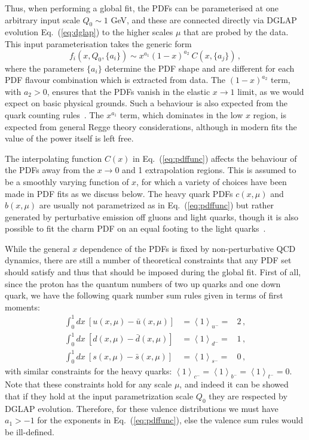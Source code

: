 Thus, when performing a global fit, the PDFs can be parameterised at one arbitrary input scale $Q_0\sim 1$ GeV, and these are connected directly via
DGLAP evolution
Eq.~(\ref{eq:dglap}) to the higher scales $\mu$ that are probed by the data.
This input parameterisation takes the generic form
\begin{equation}
\label{eq:pdffunc}
f_{i}(x,Q_0,\{a_i\})\sim x^{a_1}(1-x)^{a_2}\:C(x,\{a_j\})\, ,
\end{equation}
where the parameters $\{a_i\}$ determine the PDF shape
and are different for each PDF flavour combination which
is extracted from data.
%
The $(1-x)^{a_2}$ term, with $a_{2}>0$, ensures that the PDFs
vanish in the elastic $x\to 1$ limit, as we would expect on basic physical grounds. 
%
Such a behaviour is also expected from the quark
counting rules~\cite{Brodsky:1973kr,Ball:2016spl}.
%
The $x^{a_1}$ term, which dominates in the low $x$
region, is expected from general Regge theory considerations, although in modern fits the value of the power itself is left free.


The interpolating function $C(x)$ in
Eq.~(\ref{eq:pdffunc})
affects the behaviour of the PDFs away from the $x\to 0$ and 1
extrapolation regions.
%
This is assumed to be a smoothly varying function of $x$, for which a variety of choices have been made in PDF fits as we discuss below.
%
The heavy quark PDFs $c(x,\mu)$ and $b(x,\mu)$ are usually not
parametrized as in  Eq.~(\ref{eq:pdffunc}) but rather
generated by perturbative emission off gluons and light quarks,
though it is also possible to fit the charm PDF on an equal footing
to the light quarks~\cite{Ball:2016neh}.

While the general $x$ dependence of the PDFs is fixed by
non-perturbative QCD dynamics, there are still a number
of theoretical constraints that any PDF set should satisfy and thus that
should be imposed during the global fit.
%
First of all, since
the proton has the quantum numbers of two up quarks and one down quark,
we have the following quark number sum rules given in terms of first
moments: 
%
\begin{eqnarray}
\int_{0}^{1}dx\ \left[u(x,\mu)-\bar{u}(x,\mu)\right] & =\left\langle 1\right\rangle _{u^{-}}= & 2 \, ,\nonumber \\
\int_{0}^{1}dx\ \left[d(x,\mu)-\bar{d}(x,\mu)\right] & =\left\langle 1\right\rangle _{d^{-}}= & 1 \, ,\\
\int_{0}^{1}dx\ \left[s(x,\mu)-\bar{s}(x,\mu)\right] & =\left\langle 1\right\rangle _{s^{-}}= & 0 \, \nonumber ,
\end{eqnarray}
with similar constraints for the heavy quarks: $\left\langle 1\right\rangle _{c^{-}}=\left\langle 1\right\rangle _{b^{-}}=\left\langle 1\right\rangle _{t^{-}}=0$.
%
Note that these constraints hold for any scale $\mu$, and indeed it can be showed
that if they hold at the input parametrization scale $Q_0$ they
are respected by DGLAP evolution.
%
Therefore, for these valence distributions we must have $a_1>-1$ for the exponents in
Eq.~(\ref{eq:pdffunc}), else the valence sum rules would be ill-defined.

